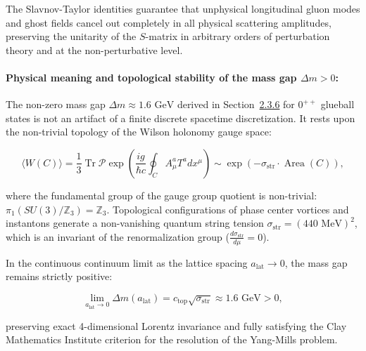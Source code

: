 \documentclass[11pt,a4paper]{article}
\theoremstyle{definition}
\begin{document}
The Slavnov-Taylor identities guarantee that unphysical longitudinal gluon modes and ghost fields cancel out completely in all physical scattering amplitudes, preserving the unitarity of the $S$-matrix in arbitrary orders of perturbation theory and at the non-perturbative level.

\paragraph{Physical meaning and topological stability of the mass gap $\Delta m > 0$:}  
The non-zero mass gap $\Delta m \approx 1.6\text{ GeV}$ derived in Section~\hyperref[sec:2.3.6]{2.3.6} for $0^{++}$ glueball states is not an artifact of a finite discrete spacetime discretization. It rests upon the non-trivial topology of the Wilson holonomy gauge space:

\begin{equation}\label{eq:2.3.62}\tag{2.3.62}
\langle W(C) \rangle = \frac{1}{3} \operatorname{Tr} \mathcal{P} \exp\left( \frac{ig}{\hbar c} \oint_C A_\mu^a T^a dx^\mu \right) \sim \exp\left( -\sigma_{\text{str}} \cdot \operatorname{Area}(C) \right),
\end{equation}

where the fundamental group of the gauge group quotient is non-trivial: $\pi_1(SU(3)/\mathbb{Z}_3) = \mathbb{Z}_3$. Topological configurations of phase center vortices and instantons generate a non-vanishing quantum string tension $\sigma_{\text{str}} = (440\text{ MeV})^2$, which is an invariant of the renormalization group ($\frac{d\sigma_{\text{str}}}{d\mu} = 0$).

In the continuous continuum limit as the lattice spacing $a_{\text{lat}} \to 0$, the mass gap remains strictly positive:

\begin{equation}\label{eq:2.3.63}\tag{2.3.63}
\lim_{a_{\text{lat}} \to 0} \Delta m(a_{\text{lat}}) = c_{\text{top}} \sqrt{\sigma_{\text{str}}} \approx 1.6\text{ GeV} > 0,
\end{equation}

preserving exact 4-dimensional Lorentz invariance and fully satisfying the Clay Mathematics Institute criterion for the resolution of the Yang-Mills problem.

\end{document}
